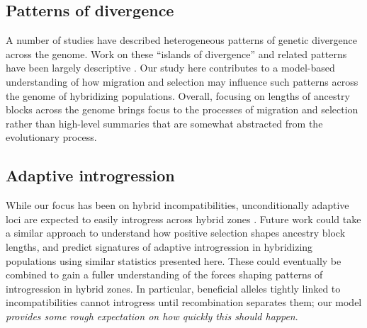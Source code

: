 \documentclass[11pt,letterpaper]{article}
\newcommand{\alisa}[1]{{\em \color{red} #1}}
\newcommand{\plr}[1]{{\em \color{blue} #1}}
\begin{document}
\subsection*{Patterns of divergence}  
A number of studies have described heterogeneous patterns of genetic divergence across the genome. 
Work on these ``islands of divergence'' \citep{turner2005genomic,Nosil2009} and related patterns have been largely descriptive \citep{Cruickshank2014,Noor2009}.
Our study here contributes to a model-based understanding of 
how migration and selection may influence such patterns across the genome of hybridizing populations. 
Overall, focusing on lengths of ancestry blocks across the genome brings focus to the processes of migration and selection 
rather than high-level summaries that are somewhat abstracted from the evolutionary process. 





\subsection*{Adaptive introgression}

While our focus has been on hybrid incompatibilities, 
unconditionally adaptive loci are expected to easily introgress across hybrid zones \citep{barton1979gene,barton1986barrier,martinsen2001hybrid,arnold2004transfer}. 
Future work could take a similar approach to understand how positive selection shapes ancestry block lengths, and predict  signatures of adaptive introgression in hybridizing populations using similar statistics presented here. These could eventually be combined to gain a fuller understanding of the forces shaping patterns of introgression in hybrid zones. 
In particular, beneficial alleles tightly linked to incompatibilities
cannot introgress until recombination separates them;
our model \alisa{provides some rough expectation on how quickly this should happen}. 
\end{document}
